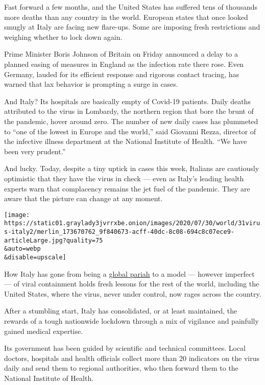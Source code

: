 Fast forward a few months, and the United States has suffered tens of
thousands more deaths than any country in the world. European states
that once looked smugly at Italy are facing new flare-ups. Some are
imposing fresh restrictions and weighing whether to lock down again.

Prime Minister Boris Johnson of Britain on Friday announced a delay to a
planned easing of measures in England as the infection rate there rose.
Even Germany, lauded for its efficient response and rigorous contact
tracing, has warned that lax behavior is prompting a surge in cases.

And Italy? Its hospitals are basically empty of Covid-19 patients. Daily
deaths attributed to the virus in Lombardy, the northern region that
bore the brunt of the pandemic, hover around zero. The number of new
daily cases has plummeted to ``one of the lowest in Europe and the
world,'' said Giovanni Rezza, director of the infective illness
department at the National Institute of Health. ``We have been very
prudent.''

And lucky. Today, despite a tiny uptick in cases this week, Italians are
cautiously optimistic that they have the virus in check --- even as
Italy's leading health experts warn that complacency remains the jet
fuel of the pandemic. They are aware that the picture can change at any
moment.

\texttt{[image: https://static01.graylady3jvrrxbe.onion/images/2020/07/30/world/31virus-italy2/merlin\_173670762\_9f840673-acff-40dc-8c08-694c8c07ece9-articleLarge.jpg?quality=75\\\&auto=webp\\\&disable=upscale]}

How Italy has gone from being a
\href{https://www.nytimes3xbfgragh.onion/2020/03/21/world/europe/italy-coronavirus-center-lessons.html}{global
pariah} to a model --- however imperfect --- of viral containment holds
fresh lessons for the rest of the world, including the United States,
where the virus, never under control, now rages across the country.

After a stumbling start, Italy has consolidated, or at least maintained,
the rewards of a tough nationwide lockdown through a mix of vigilance
and painfully gained medical expertise.

Its government has been guided by scientific and technical committees.
Local doctors, hospitals and health officials collect more than 20
indicators on the virus daily and send them to regional authorities, who
then forward them to the National Institute of Health.

